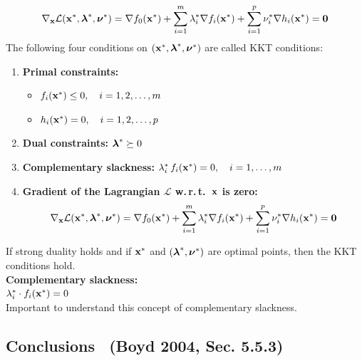   \begin{displaymath}
    \nabla_{\bm{\mathrm{x}}} \mathcal L(\bm{\mathrm{x}}^*, \bm{\mathrm{\lambda}}^*, \bm{\mathrm{\nu}}^*) = 
    \nabla f_0(\bm{\mathrm{x}}^*) + 
    \sum_{i=1}^m \lambda_i^* \nabla f_i(\bm{\mathrm{x}}^*) + 
    \sum_{i=1}^p \nu_i^* \nabla h_i(\bm{\mathrm{x}}^*) =  \bm{\mathrm{0}}
  \end{displaymath}
  The following four conditions on $(\bm{\mathrm{x}}^*,\bm{\mathrm{\lambda}}^*,\bm{\mathrm{\nu}}^*)$ are called KKT conditions: 
  \begin{enumerate}
    \item \textbf{Primal constraints:} 
      \begin{itemize}
        \item $f_i(\bm{\mathrm{x}}^*) \leq 0, \quad i = 1, 2, \dots, m$
        \item $h_i(\bm{\mathrm{x}}^*) =    0, \quad i = 1, 2, \dots, p$  
      \end{itemize}
    \item \textbf{Dual constraints:} $\bm{\mathrm{\lambda}}^* \succeq 0$  
    \item \textbf{Complementary slackness:} $ \lambda_i^* \, f_i(\bm{\mathrm{x}}^*)= 0, \quad i=1,\dots,m$   
    \item \textbf{Gradient of the Lagrangian $\mathcal L$ w.\,r.\,t.\ $\bm{\mathrm{x}}$ is zero:}
      \begin{displaymath}
        \nabla_{\bm{\mathrm{x}}} \mathcal L(\bm{\mathrm{x}}^*, \bm{\mathrm{\lambda}}^*, \bm{\mathrm{\nu}}^*) = 
        \nabla f_0(\bm{\mathrm{x}}^*) + 
        \sum_{i=1}^m\lambda_i^* \nabla f_i(\bm{\mathrm{x}}^*) +        
        \sum_{i=1}^p\nu_i^* \nabla h_i(\bm{\mathrm{x}}^*) = 
        \bm{\mathrm{0}}
      \end{displaymath}
  \end{enumerate}
   If strong duality holds and if $\bm{\mathrm{x}}^*$ and $(\bm{\mathrm{\lambda}}^*, \bm{\mathrm{\nu}}^*)$ are optimal points, then the KKT conditions hold.\\
  
    \textbf{Complementary slackness:}\\ { $\lambda_i^* \cdot f_i(\bm{\mathrm{x}}^*) = 0$}\\
    Important to understand this concept of complementary slackness. 
     
   \subsection{Conclusions \scriptsize ~(Boyd 2004, Sec. 5.5.3)}

